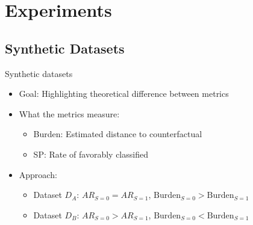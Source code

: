 \documentclass[aspectratio=169]{beamer}
\begin{document}
\section{Experiments}
\subsection{Synthetic Datasets}

\begin{frame}{Synthetic datasets}
\begin{itemize}
    \item Goal: Highlighting theoretical difference between metrics
    \item What the metrics measure:
    \begin{itemize}
        \item Burden: Estimated \alert{distance} to counterfactual
        \item SP: \alert{Rate} of favorably classified
    \end{itemize}
    \item Approach:
    \begin{itemize}
        \item Dataset $D_A$: $AR_{S=0} = AR_{S=1}$, $\text{Burden}_{S=0} > \text{Burden}_{S=1}$ 
        \item Dataset $D_B$: $AR_{S=0} > AR_{S=1}$, $\text{Burden}_{S=0} < \text{Burden}_{S=1}$ 
    \end{itemize}
\end{itemize}
\end{frame}
\end{document}
